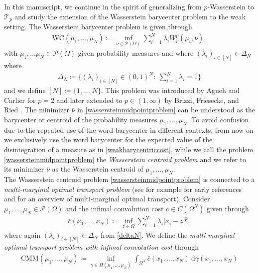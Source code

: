 \documentclass[letterpaper]{amsart}
\newcommand{\dd}{\mathrm{d}}
\theoremstyle{definition}
\begin{document}
In this manuscript, we continue in the spirit of generalizing from $p$-Wasserstein to $\mathcal T_p$ and study the extension of the Wasserstein barycenter problem to the weak setting. 
The Wasserstein barycenter problem is given through
\begin{gather}\label{wassersteinmidpointproblem}
	\text{WC}(\mu_1,\dots,\mu_N)\coloneqq\inf_{\nu\in\mathcal P(\Omega)}\sum_{i=1}^N\lambda_i W_p^p(\mu_i,\nu),
\end{gather}
with $\mu_1,\dots\mu_N\in\mathcal P(\Omega)$ given probability measures and where $(\lambda_i)_{i\in[N]}\in\Delta_N$ where 
\begin{gather}\label{deltaN}
	\Delta_N\coloneqq\Big\{(\lambda_i)_{i\in[N]}\in(0,1)^N:\ \sum_{i=1}^N\lambda_i=1\Big\}
\end{gather}
and we define $[N]\coloneqq\{1,\dots,N\}$.
 This problem was introduced by Agueh and Carlier \cite{agueh2011} for $p=2$ and later extended to $p\in (1,\infty)$ by Brizzi, Friesecke, and Ried \cite{brizzi2025}. The minimizer $\bar\nu$ in \eqref{wassersteinmidpointproblem} can be understood as the barycenter or centroid of the probability measures $\mu_1,\dots,\mu_N$. To avoid confusion due to the repeated use of the word barycenter in different contexts, from now on we exclusively use the word barycenter for the expected value of the disintegration of a measure as in \eqref{weakbarycentriccost}, while we call the problem \eqref{wassersteinmidpointproblem} the \textit{Wasserstein centroid problem} and we refer to its minimizer $\bar\nu$ as the Wasserstein centroid of $\mu_1,\dots,\mu_N$.\\
The Wasserstein centroid problem \eqref{wassersteinmidpointproblem} is connected to a \textit{multi-marginal optimal transport problem} (see for example \cite{ruschendorf1981,gaffke1981,kellerer1984} for early references and \cite{pass2015} for an overview of multi-marginal optimal transport). Consider $\mu_1,\dots,\mu_N\in\mathcal P(\Omega)$ and the infimal convolution cost $\bar c\in C(\Omega^N)$ given through
\begin{gather}\label{infconvcost}
	\bar c(x_1,\dots,x_N)\coloneqq\inf_{z\in\Omega}\sum_{i=1}^N\lambda_i|x_i-z|^p,
\end{gather}
 where again $(\lambda_i)_{i\in [N]}\in\Delta_N$ from \eqref{deltaN}. We define the \textit{multi-marginal optimal transport problem with infimal convolution cost} through
 \begin{gather}\label{CMM}
 	\text{CMM}(\mu_1,\dots,\mu_N)\coloneqq\inf_{\gamma\in\Pi(\mu_1,\dots,\mu_N)}\int_{\Omega^N}\bar c(x_1,\dots,x_N)\ \dd\gamma(x_1,\dots,x_N)
 \end{gather}
\end{document}
